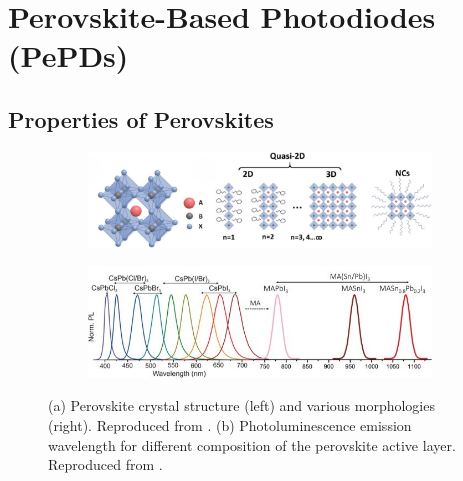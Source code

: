 \section{Perovskite-Based Photodiodes (PePDs)}

\subsection{Properties of Perovskites}

\begin{figure}[htbp]
    \centering
    \begin{subfigure}[b]{\textwidth}
    \centering
        \includegraphics[width=0.85\linewidth]{chapters/introduction/image/perovskite_structure.jpg}
        \caption{}
        \label{fig:ch1:perovskite structure}
    \end{subfigure}

    \vspace{0.5cm}
    
    \begin{subfigure}[b]{\textwidth}
    \centering
        \includegraphics[width=0.85\linewidth]{chapters/introduction/image/bandgap_tunability.jpg}
        \caption{}
        \label{fig:ch1:bandgap_tunability}
    \end{subfigure}
    
    \caption[Perovskites' structure and bandgap tunability.]{(a) Perovskite crystal structure (left) and various morphologies (right). Reproduced from \cite{Lei2021MetalApplications}. (b) Photoluminescence emission wavelength for different composition of the perovskite active layer. Reproduced from \cite{Gholipour2020BandgapMaterials}.}
    \label{fig:ch1:perovskite_strucutre_bandgap}
\end{figure}


